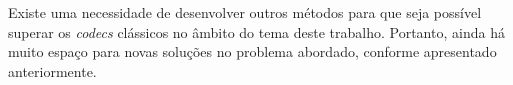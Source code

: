 Existe uma necessidade de desenvolver outros métodos para que seja possível superar os \textit{codecs} clássicos no âmbito do tema deste trabalho. Portanto, ainda há muito espaço para novas soluções no problema abordado, conforme apresentado anteriormente.

